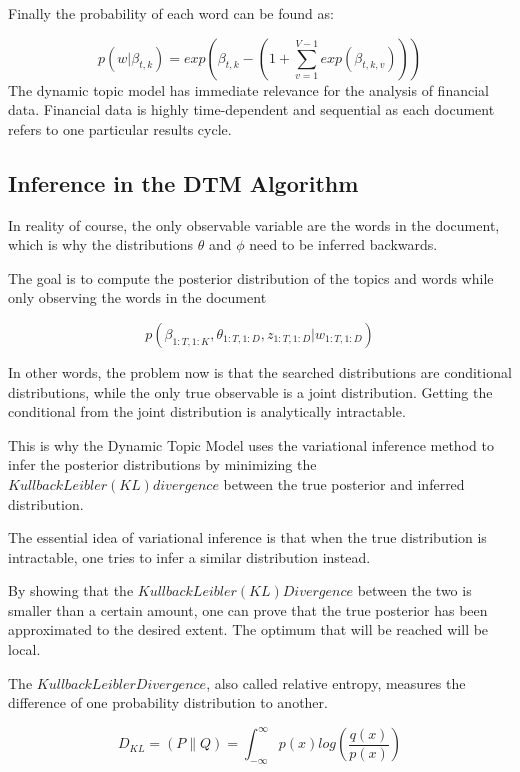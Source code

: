 \documentclass[12pt,journal,letterpaper,oneside,onecolumn]{IEEEtran}
\begin{document}
Finally the probability of each word can be found as:

\begin{equation}
p(w| \beta_{t,k}) = exp(\beta_{t,k} - (1+ \sum_{v=1}^{V-1} exp(\beta_{t,k,v})))
\end{equation}
The dynamic topic model has immediate relevance for the analysis of financial data. Financial data is highly time-dependent and sequential as each document refers to one particular results cycle.



\subsection{Inference in the DTM Algorithm}

In reality of course, the only observable variable are the words in the document, which is why the distributions $\theta$ and $\phi$ need to be inferred backwards.

The goal is to compute the posterior distribution  of the topics and words while only observing the words in the document

\begin{equation}
p(\beta_{1:T, 1:K}, \theta_{1:T, 1:D}, z_{1:T, 1:D} | w_{1:T, 1:D})
\end{equation}


In other words, the problem now is that the searched distributions are conditional distributions, while the only true observable is a joint distribution. Getting the conditional from the joint distribution is analytically intractable.

This is why the Dynamic Topic Model uses the variational inference method to infer the posterior distributions by minimizing the $Kullback Leibler (KL) divergence$ between the true posterior and inferred distribution.

The essential idea of variational inference is that when the true distribution is intractable, one tries to infer a similar distribution instead. 

By showing that the $Kullback Leibler (KL) Divergence$ between the two is smaller than a certain amount, one can prove that the true posterior has been approximated to the desired extent.
The optimum that will be reached will be local.

The $Kullback Leibler Divergence$, also called relative entropy, measures the difference of one probability distribution to another.

\begin{equation}
D_{KL} = (P \parallel Q) = \int_{- \infty}^{\infty} p(x) log \left( \frac{q (x)}{p(x)} \right)
\end{equation}
\end{document}
